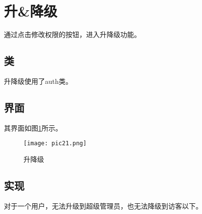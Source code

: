 \documentclass[forprint]{shmtu}
\begin{document}
\section{升\&降级}

通过点击修改权限的按钮，进入升降级功能。

\subsection{类}

升降级使用了auth类。

\subsection{界面}

其界面如图\ref{pic:21}所示。

\begin{figure}[!htbp]
	\centering
	\texttt{[image: pic21.png]}
	\caption{升降级}
	\label{pic:21}
\end{figure}

\subsection{实现}

对于一个用户，无法升级到超级管理员，也无法降级到访客以下。
\end{document}
